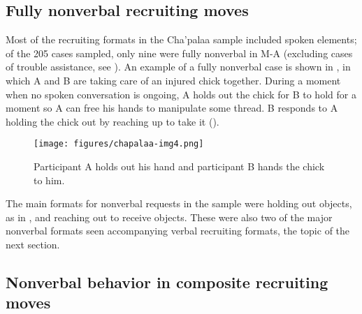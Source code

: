 \documentclass[output=paper]{langsci/langscibook}
\begin{document}
\subsection{Fully nonverbal recruiting moves}\label{sec:floyd:3.1}

Most of the recruiting formats in the Cha'palaa sample included spoken elements; of the 205 cases sampled, only nine were fully nonverbal in M-A (excluding cases of trouble assistance, see ). An example of a fully nonverbal case is shown in , in which A and B are taking care of an injured chick together. During a moment when no spoken conversation is ongoing, A holds out the chick for B to hold for a moment so A can free his hands to manipulate some thread. B responds to A holding the chick out by reaching up to take it ().

\newpage
{}%
%
\begin{mdframednoverticalspace}[style=firstfoc]
\end{mdframednoverticalspace}
%
\begin{mdframednoverticalspace}[style=secondfoc]
\end{mdframednoverticalspace}

\begin{figure}
\texttt{[image: figures/chapalaa-img4.png]}
\caption{Participant A holds out his hand and participant B hands the chick to him.}
\label{fig:floyd:2}
\end{figure}

The main formats for nonverbal requests in the sample were holding out objects, as in , and reaching out to receive objects. These were also two of the major nonverbal formats seen accompanying verbal recruiting formats, the topic of the next section.

\subsection{Nonverbal behavior in composite recruiting moves}\label{sec:floyd:3.2}
\end{document}
